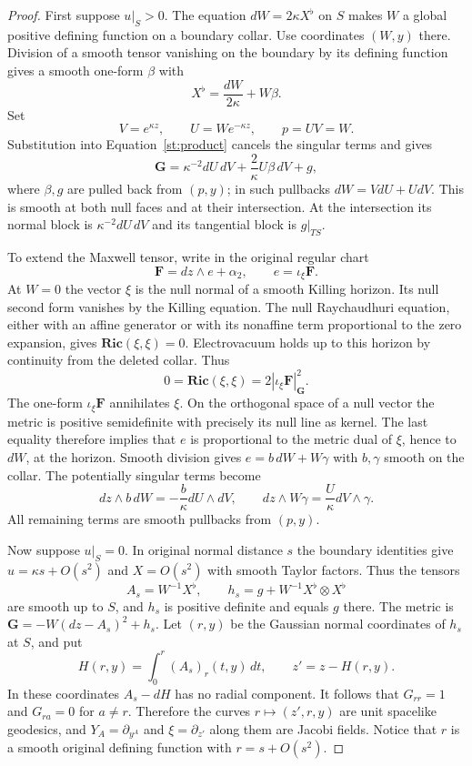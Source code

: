 \begin{proof}
First suppose $u|_S>0$.  The equation
$dW=2\kappa X^\flat$ on $S$ makes $W$ a global positive defining
function on a boundary collar.  Use coordinates $(W,y)$ there.
Division of a smooth tensor vanishing on the boundary by its defining
function gives a smooth one-form $\beta$ with
\[
 X^\flat=\frac{dW}{2\kappa}+W\beta.
\]
Set
\begin{equation}\label{st:positive-coordinates}
 V=e^{\kappa z},\qquad U=W e^{-\kappa z},\qquad p=UV=W.
\end{equation}
Substitution into Equation~\eqref{st:product} cancels the singular
terms and gives
\begin{equation}\label{st:positive-extension}
 \mathbf G=\kappa^{-2}dU\,dV+\frac{2}{\kappa}U\beta\,dV+g,
\end{equation}
where $\beta,g$ are pulled back from $(p,y)$; in such pullbacks
$dW=VdU+UdV$.  This is smooth at both null faces and at their
intersection.  At the intersection its normal block is
$\kappa^{-2}dU\,dV$ and its tangential block is $g|_{TS}$.

To extend the Maxwell tensor, write in the original regular chart
\[
 \mathbf F=dz\wedge e+\alpha_2,
 \qquad e=\iota_\xi\mathbf F.
\]
At $W=0$ the vector $\xi$ is the null normal of a smooth Killing
horizon.  Its null second form vanishes by the Killing equation.
The null Raychaudhuri equation, either with an affine generator or
with its nonaffine term proportional to the zero expansion, gives
$\mathbf{Ric}(\xi,\xi)=0$.  Electrovacuum holds up to this horizon
by continuity from the deleted collar.  Thus
\[
 0=\mathbf{Ric}(\xi,\xi)
    =2|\iota_\xi\mathbf F|_{\mathbf G}^2.
\]
The one-form $\iota_\xi\mathbf F$ annihilates $\xi$.  On the
orthogonal space of a null vector the metric is positive semidefinite
with precisely its null line as kernel.  The last equality therefore
implies that $e$ is proportional to the metric dual of $\xi$, hence
to $dW$, at the horizon.  Smooth division gives
$e=b\,dW+W\gamma$ with $b,\gamma$ smooth on the collar.  The
potentially singular terms become
\[
 dz\wedge b\,dW=-\frac{b}{\kappa}dU\wedge dV,
 \qquad dz\wedge W\gamma=\frac{U}{\kappa}dV\wedge\gamma.
\]
All remaining terms are smooth pullbacks from $(p,y)$.

Now suppose $u|_S=0$.  In original normal distance $s$ the boundary
identities give $u=\kappa s+O(s^2)$ and $X=O(s^2)$ with smooth
Taylor factors.  Thus the tensors
\begin{equation}\label{st:orbit-collar}
 A_s=W^{-1}X^\flat,\qquad
 h_s=g+W^{-1}X^\flat\otimes X^\flat
\end{equation}
are smooth up to $S$, and $h_s$ is positive definite and equals $g$
there.  The metric is
$\mathbf G=-W(dz-A_s)^2+h_s$.  Let $(r,y)$ be the Gaussian normal
coordinates of $h_s$ at $S$, and put
\[
 H(r,y)=\int_0^r(A_s)_r(t,y)\,dt,
 \qquad z'=z-H(r,y).
\]
In these coordinates $A_s-dH$ has no radial component.  It follows
that $G_{rr}=1$ and $G_{ra}=0$ for $a\ne r$.  Therefore the curves
$r\mapsto(z',r,y)$ are unit spacelike geodesics, and
$Y_A=\partial_{y^A}$ and $\xi=\partial_{z'}$ along them are
Jacobi fields.  Notice that $r$ is a smooth original defining
function with $r=s+O(s^2)$.


\end{proof}
